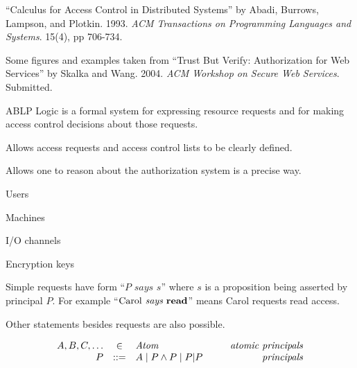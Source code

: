 
\newcommand{\as}{\textit{ as }}
\newcommand{\controls}{\textit{ controls }}
\newcommand{\for}{\textit{ for }}
\renewcommand{\implies}{\supset}
\newcommand{\says}{\textit{ says }}
\newcommand{\serves}{\textit{ serves }}
\newcommand{\speaksfor}{\Rightarrow}


``Calculus for Access Control in Distributed Systems'' by Abadi,
Burrows, Lampson, and Plotkin. 1993. \textit{ACM Transactions on
  Programming Languages and Systems}. 15(4), pp 706-734.

Some figures and examples taken from ``Trust But Verify: Authorization
for Web Services'' by Skalka and Wang. 2004. \textit{ACM Workshop on
  Secure Web Services}. Submitted.

\stopslide



ABLP Logic is a formal system for expressing resource requests and for
making access control decisions about those requests.

\begin{citemize}
\item Allows access requests and access control lists to be clearly defined.
\item Allows one to reason about the authorization system is a precise way.
\end{citemize}

\stopslide



\begin{citemize}
  \item Users
  \item Machines
  \item I/O channels
  \item Encryption keys
\end{citemize}

Simple requests have form ``$P \says s$'' where $s$ is a proposition
being asserted by principal $P$. For example ``$\text{Carol} \says
\mathrm{\bf read}$'' means Carol requests read access.

Other statements besides requests are also possible.

\stopslide



$$\begin{array}{rcl@{\hspace{10mm}}r}
A,B,C,\ldots &\in& \mathit{Atom} & \gdesc{atomic principals} \\
P &::=& A \mid  P \wedge P \mid P|P & \gdesc{principals}\\
\end{array}$$

